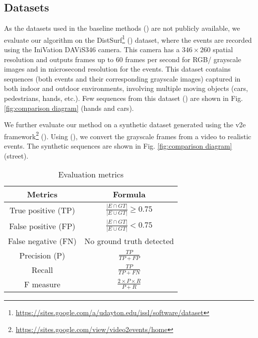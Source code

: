 \documentclass{article}
\begin{document}
\subsection{Datasets}

As the datasets used in the baseline methods (\cite{pikatkowska2012spatiotemporal,chen2018neuromorphic}) are not publicly available, we evaluate our algorithm on the DistSurf\footnote{\url{https://sites.google.com/a/udayton.edu/issl/software/dataset}} (\cite{almatrafi2020distance}) dataset, where the events are recorded using the IniVation DAViS346 camera. This camera has a $346 \times 260$ spatial resolution and outputs frames up to $60$ frames per second for RGB/ grayscale images and in microsecond resolution for the events. This dataset contains sequences (both events and their corresponding grayscale images) captured in both indoor and outdoor environments, involving multiple moving objects (cars, pedestrians, hands, etc.). Few sequences from this dataset (\cite{almatrafi2020distance}) are shown in Fig. \ref{fig:comparison diagram} (hands and cars). 

We further evaluate our method on a synthetic dataset generated using the v2e framework\footnote{\url{https://sites.google.com/view/video2events/home}} (\cite{hu2021v2e}). Using (\cite{hu2021v2e}), we convert the grayscale frames from a video to realistic events. The synthetic sequences are shown in Fig. \ref{fig:comparison diagram} (street).


\begin{table}[]
\centering
\caption{Evaluation metrics}
\label{tab:metric}
\begin{tabular}{|c|c|}
\hline
\textbf{Metrics} & \textbf{Formula} \\ \hline
True positive (TP) & ${\frac{\left|E \cap GT \right|}{\left|E \cup GT \right|} \ge 0.75}$ \\ \hline
False positive (FP) & ${\frac{\left|E \cap GT \right|}{\left|E \cup GT \right|} < 0.75}$ \\ \hline
False negative (FN) & No ground truth detected \\ \hline
Precision (P) & ${\frac{TP}{TP+FP}}$ \\ \hline
Recall & ${\frac{TP}{TP+FN}}$ \\ \hline
F measure & $\frac{2 \times P \times R} {P + R}$ \\ \hline
\end{tabular}
\end{table}
\end{document}
